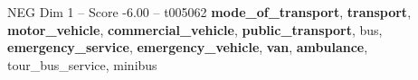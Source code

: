 \begin{textsample}{NEG Dim 1 – Score -6.00 – t005062}  \label{ex:f1_neg_006}
\textbf{mode\_of\_transport}, \textbf{transport}, \textbf{motor\_vehicle}, \textbf{commercial\_vehicle}, \textbf{public\_transport}, bus, \textbf{emergency\_service}, \textbf{emergency\_vehicle}, \textbf{van}, \textbf{ambulance}, tour\_bus\_service, minibus

\end{textsample}
